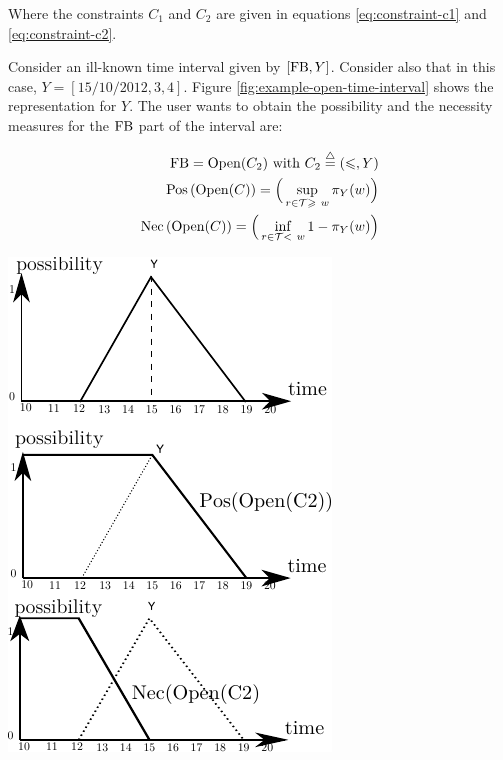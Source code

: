 Where the constraints $C_1$ and $C_2$ are given in equations \eqref{eq:constraint-c1} and \eqref{eq:constraint-c2}.

\begin{example}
\label{ex:open-time-interval}
Consider an ill-known time interval given by $\left[\operatorname{FB}, Y \right]$. Consider also that in this case, $Y= \left[15/10/2012,3,4 \right] $. Figure \ref{fig:example-open-time-interval} shows the representation for $Y$. The user wants to obtain the possibility and the necessity measures for the $\operatorname{FB}$ part of the interval are:
\end{example}

\begin{eqnarray}
\nonumber
\operatorname{FB} = \operatorname{Open}(C_2) \mbox{ with } C_2\stackrel{\triangle}{=}\left(\leqslant,Y\right)\\
\nonumber
\operatorname{Pos}\left(\operatorname{Open}(C)\right) = \Big(\sup_{r\in\mathcal{T} \geqslant\  w}\pi_{Y}(w)\Big)\\
\nonumber
\operatorname{Nec}\left(\operatorname{Open}(C)\right) = \Big(\inf_{r\in\mathcal{T} <\  w}1-\pi_{Y}(w)\Big)
\end{eqnarray}


\vspace*{13pt}
\begin{center}
{
\includegraphics[scale=1]{./graphs/open-time-interval.pdf}
\label{fig:example-open-time-interval}
}
\end{center}
\vspace*{10pt}
\vspace*{13pt}


